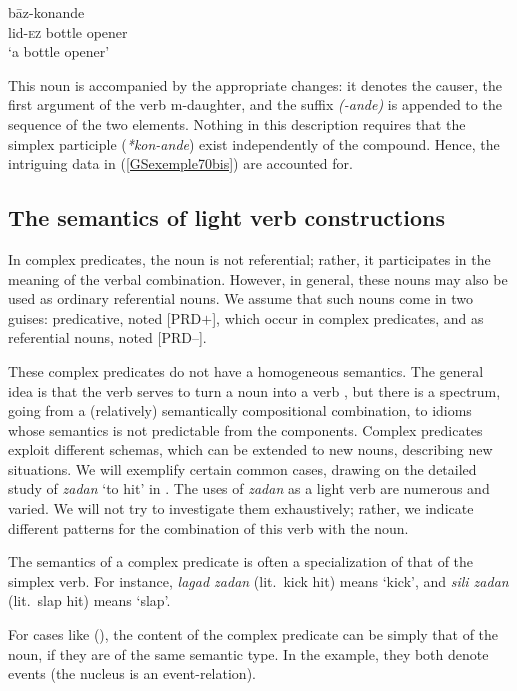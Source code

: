 \ea
\label{GSexemple74}
 b\=az-konande\\
     \spacebr{}lid-\textsc{ez} bottle opener\\
\glt `a bottle opener'
\z

\noindent
This noun is accompanied by the appropriate changes: it denotes the causer, the
first argument of the verb m-daughter, and the suffix \emph{(-ande)} is appended to the sequence of
the two elements. Nothing in this description requires that the simplex participle
(\emph{*kon-ande}) exist independently of the compound. Hence, the intriguing data in
(\ref{GSexemple70bis}) are accounted for.

\subsection{The semantics of light verb constructions}\label{GSsection5.3}

In complex predicates, the noun is not referential; rather, it participates in the meaning of the verbal combination. However, in general, these nouns may also be used as ordinary referential nouns. We assume that such nouns come in two guises: predicative, noted [PRD$+$], which occur in complex predicates, and as referential nouns, noted [PRD$–$].

These complex predicates do not have a homogeneous semantics. The general idea is that the verb serves to turn a noun into a verb \citep{bonami2010persian}, but there is a spectrum, going from a (relatively) semantically compositional combination, to idioms whose semantics is not predictable from the components. Complex predicates exploit different schemas, which can be extended to new nouns, describing new situations. We will exemplify certain common cases, drawing on the detailed study of \emph{zadan} `to hit' in . The uses of \emph{zadan} as a light verb are numerous and varied. We will not try to investigate them exhaustively; rather, we indicate different patterns for the combination of this verb with the noun. 

The semantics of a complex predicate is often a specialization of that of the simplex verb. For instance, \emph{lagad zadan} (lit.\ kick hit) means `kick', and \emph{sili zadan} (lit.\ slap hit) means `slap'. 

\z
\largerpage[2]
For cases like (), the content of the complex predicate can be simply that of the noun, if they are of the
same semantic type. In the example, they both denote events (the nucleus is an event-relation). 

